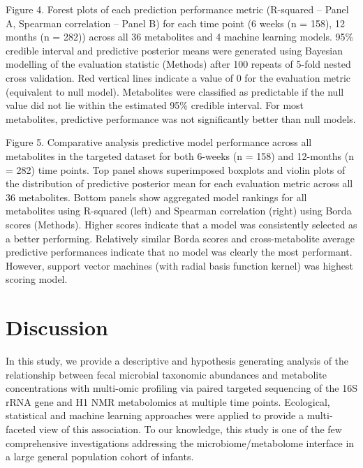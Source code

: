 Figure 4. Forest plots of each prediction performance metric (R-squared – Panel A, Spearman correlation – Panel B) for each time point (6 weeks (n = 158), 12 months (n = 282)) across all 36 metabolites and 4 machine learning models. 95\% credible interval and predictive posterior means were generated using Bayesian modelling of the evaluation statistic (Methods) after 100 repeats of 5-fold nested cross validation. Red vertical lines indicate a value of 0 for the evaluation metric (equivalent to null model). Metabolites were classified as predictable if the null value did not lie within the estimated 95\% credible interval. For most metabolites, predictive performance was not significantly better than null models.  

 
Figure 5. Comparative analysis predictive model performance across all metabolites in the targeted dataset for both 6-weeks (n = 158) and 12-months (n = 282) time points. Top panel shows superimposed boxplots and violin plots of the distribution of predictive posterior mean for each evaluation metric across all 36 metabolites. Bottom panels show aggregated model rankings for all metabolites using R-squared (left) and Spearman correlation (right) using Borda scores (Methods). Higher scores indicate that a model was consistently selected as a better performing. Relatively similar Borda scores and cross-metabolite average predictive performances indicate that no model was clearly the most performant. However, support vector machines (with radial basis function kernel) was highest scoring model. 
\section{Discussion}
In this study, we provide a descriptive and hypothesis generating analysis of  the relationship between fecal microbial taxonomic abundances and metabolite concentrations with multi-omic profiling via paired targeted sequencing of the 16S rRNA gene and H1 NMR metabolomics at multiple time points. Ecological, statistical and machine learning approaches were applied to provide a multi-faceted view of this association. To our knowledge, this study is one of the few comprehensive investigations addressing the microbiome/metabolome interface in a large general population cohort of infants. 
